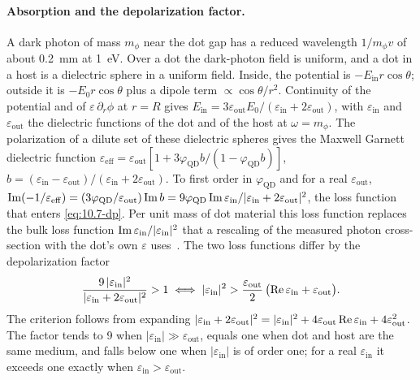 \paragraph{Absorption and the depolarization factor.} A dark photon of mass $m_\phi$ near the dot gap has a reduced wavelength $1/m_\phi v$ of about \SI{0.2}{mm} at \SI{1}{eV}. Over a dot the dark-photon field is uniform, and a dot in a host is a dielectric sphere in a uniform field. Inside, the potential is $-E_{\mathrm{in}}r\cos\theta$; outside it is $-E_0r\cos\theta$ plus a dipole term $\propto\cos\theta/r^2$. Continuity of the potential and of $\varepsilon\,\partial_r\phi$ at $r = R$ gives $E_{\mathrm{in}} = 3\varepsilon_{\mathrm{out}}E_0/(\varepsilon_{\mathrm{in}} + 2\varepsilon_{\mathrm{out}})$, with $\varepsilon_{\mathrm{in}}$ and $\varepsilon_{\mathrm{out}}$ the dielectric functions of the dot and of the host at $\omega = m_\phi$. The polarization of a dilute set of these dielectric spheres gives the Maxwell Garnett dielectric function $\varepsilon_{\mathrm{eff}} = \varepsilon_{\mathrm{out}}[1 + 3\varphi_{\mathrm{QD}}b/(1 - \varphi_{\mathrm{QD}}b)]$, $b = (\varepsilon_{\mathrm{in}} - \varepsilon_{\mathrm{out}})/(\varepsilon_{\mathrm{in}} + 2\varepsilon_{\mathrm{out}})$. To first order in $\varphi_{\mathrm{QD}}$ and for a real $\varepsilon_{\mathrm{out}}$, $\operatorname{Im}(-1/\varepsilon_{\mathrm{eff}}) = (3\varphi_{\mathrm{QD}}/\varepsilon_{\mathrm{out}})\operatorname{Im} b = 9\varphi_{\mathrm{QD}}\operatorname{Im}\varepsilon_{\mathrm{in}}/|\varepsilon_{\mathrm{in}} + 2\varepsilon_{\mathrm{out}}|^2$, the loss function that enters \cref{eq:10.7-dp}. Per unit mass of dot material this loss function replaces the bulk loss function $\operatorname{Im}\varepsilon_{\mathrm{in}}/|\varepsilon_{\mathrm{in}}|^2$ that a rescaling of the measured photon cross-section with the dot's own $\varepsilon$ uses~\cite[Eq.~(16)]{blanco2023dark}. The two loss functions differ by the depolarization factor
\begin{equation}
  \frac{9\,|\varepsilon_{\mathrm{in}}|^2}{|\varepsilon_{\mathrm{in}} + 2\varepsilon_{\mathrm{out}}|^2} > 1 \iff |\varepsilon_{\mathrm{in}}|^2 > \frac{\varepsilon_{\mathrm{out}}}{2}\,\bigl(\operatorname{Re}\varepsilon_{\mathrm{in}} + \varepsilon_{\mathrm{out}}\bigr) .
  \label{eq:16.3-depol}
\end{equation}
The criterion follows from expanding $|\varepsilon_{\mathrm{in}} + 2\varepsilon_{\mathrm{out}}|^2 = |\varepsilon_{\mathrm{in}}|^2 + 4\varepsilon_{\mathrm{out}}\operatorname{Re}\varepsilon_{\mathrm{in}} + 4\varepsilon_{\mathrm{out}}^2$. The factor tends to 9 when $|\varepsilon_{\mathrm{in}}| \gg \varepsilon_{\mathrm{out}}$, equals one when dot and host are the same medium, and falls below one when $|\varepsilon_{\mathrm{in}}|$ is of order one; for a real $\varepsilon_{\mathrm{in}}$ it exceeds one exactly when $\varepsilon_{\mathrm{in}} > \varepsilon_{\mathrm{out}}$.


